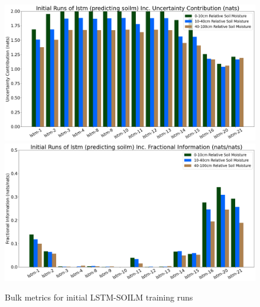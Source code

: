 \begin{figure}[hp!]
    \includegraphics[width=.48\linewidth,draft=false]{figures/efficiency_initial-best/eval_test_efficiency_initial-lstm-soilm_info-loss_res.png}
    \includegraphics[width=.48\linewidth,draft=false]{figures/efficiency_initial-best/eval_test_efficiency_initial-lstm-soilm_fi_res.png}

    \caption{Bulk metrics for initial LSTM-SOILM training runs}
    \label{model-init-fnn}
\end{figure}

